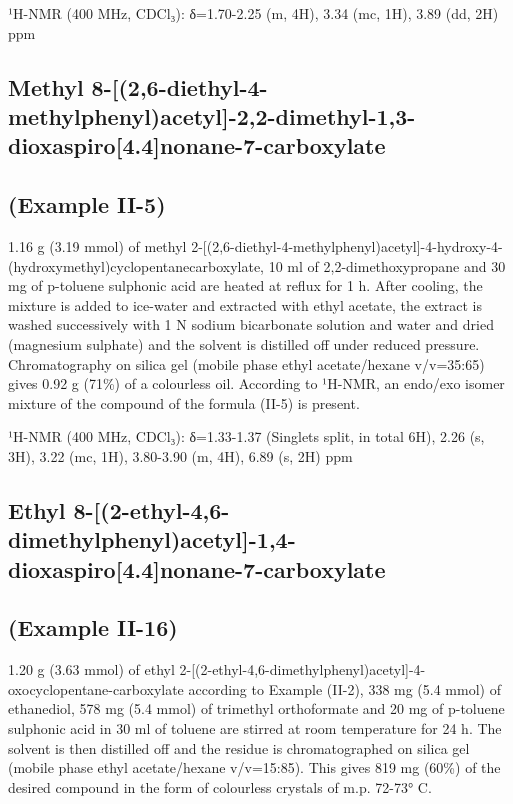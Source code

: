 \documentclass[11pt,a4paper]{article}
\begin{document}
¹H-NMR (400 MHz, CDCl₃): δ=1.70-2.25 (m, 4H), 3.34 (mc, 1H), 3.89 (dd, 2H) ppm

\subsection{Methyl 8-[(2,6-diethyl-4-methylphenyl)acetyl]-2,2-dimethyl-1,3-dioxaspiro[4.4]nonane-7-carboxylate}

\subsection{(Example II-5)}

1.16 g (3.19 mmol) of methyl 2-[(2,6-diethyl-4-methylphenyl)acetyl]-4-hydroxy-4-(hydroxymethyl)cyclopentanecarboxylate, 10 ml of 2,2-dimethoxypropane and 30 mg of p-toluene sulphonic acid are heated at reflux for 1 h. After cooling, the mixture is added to ice-water and extracted with ethyl acetate, the extract is washed successively with 1 N sodium bicarbonate solution and water and dried (magnesium sulphate) and the solvent is distilled off under reduced pressure. Chromatography on silica gel (mobile phase ethyl acetate/hexane v/v=35:65) gives 0.92 g (71\%) of a colourless oil. According to ¹H-NMR, an endo/exo isomer mixture of the compound of the formula (II-5) is present.

¹H-NMR (400 MHz, CDCl₃): δ=1.33-1.37 (Singlets split, in total 6H), 2.26 (s, 3H), 3.22 (mc, 1H), 3.80-3.90 (m, 4H), 6.89 (s, 2H) ppm

\subsection{Ethyl 8-[(2-ethyl-4,6-dimethylphenyl)acetyl]-1,4-dioxaspiro[4.4]nonane-7-carboxylate}

\subsection{(Example II-16)}

1.20 g (3.63 mmol) of ethyl 2-[(2-ethyl-4,6-dimethylphenyl)acetyl]-4-oxocyclopentane-carboxylate according to Example (II-2), 338 mg (5.4 mmol) of ethanediol, 578 mg (5.4 mmol) of trimethyl orthoformate and 20 mg of p-toluene sulphonic acid in 30 ml of toluene are stirred at room temperature for 24 h. The solvent is then distilled off and the residue is chromatographed on silica gel (mobile phase ethyl acetate/hexane v/v=15:85). This gives 819 mg (60\%) of the desired compound in the form of colourless crystals of m.p. 72-73° C.
\end{document}
